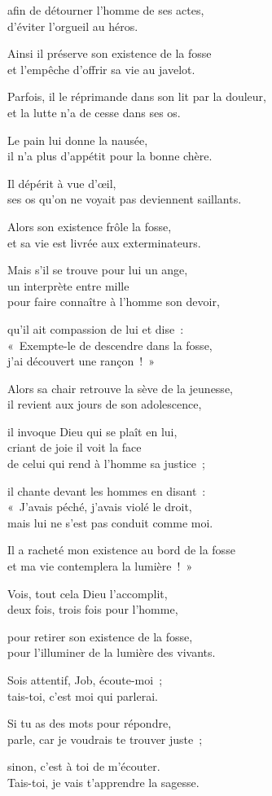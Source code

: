 \documentclass[twoside]{book} %
\newcommand{\lnatt}[1]{\reversemarginpar\marginpar[\sffamily\scriptsize #1]{}}
\newcommand{\lpar}[1]{\noindent\hangindent=2\parindent  #1\par} %
\newcommand\chapteropen{} %
\newcommand\chapterclose{} %
\renewcommand{\lnatt}[1]{\marginpar{\sffamily\scriptsize #1}}
\begin{document}
\lpar{afin de détourner l’homme de ses actes, \\
d’éviter l’orgueil au héros.}
\lpar{Ainsi il préserve son existence de la fosse \\
et l’empêche d’offrir sa vie au javelot.}
\bigskip
\lpar{Parfois, il le réprimande dans son lit par la douleur, \\
et la lutte n’a de cesse dans ses os.}
\lpar{\lnatt{20}Le pain lui donne la nausée, \\
il n’a plus d’appétit pour la bonne chère.}
\lpar{Il dépérit à vue d’œil, \\
ses os qu’on ne voyait pas deviennent saillants.}
\lpar{Alors son existence frôle la fosse, \\
et sa vie est livrée aux exterminateurs.}
\lpar{Mais s’il se trouve pour lui un ange, \\
un interprète entre mille \\
pour faire connaître à l’homme son devoir,}
\lpar{qu’il ait compassion de lui et dise : \\
« Exempte-le de descendre dans la fosse, \\
j’ai découvert une rançon ! »}
\lpar{\lnatt{25}Alors sa chair retrouve la sève de la jeunesse, \\
il revient aux jours de son adolescence,}
\lpar{il invoque Dieu qui se plaît en lui, \\
criant de joie il voit la face \\
de celui qui rend à l’homme sa justice ;}
\lpar{il chante devant les hommes en disant : \\
« J’avais péché, j’avais violé le droit, \\
mais lui ne s’est pas conduit comme moi.}
\lpar{Il a racheté mon existence au bord de la fosse \\
et ma vie contemplera la lumière ! »}
\bigskip
\lpar{Vois, tout cela Dieu l’accomplit, \\
deux fois, trois fois pour l’homme,}
\lpar{\lnatt{30}pour retirer son existence de la fosse, \\
pour l’illuminer de la lumière des vivants.}
\lpar{Sois attentif, Job, écoute-moi ; \\
tais-toi, c’est moi qui parlerai.}
\lpar{Si tu as des mots pour répondre, \\
parle, car je voudrais te trouver juste ;}
\lpar{sinon, c’est à toi de m’écouter. \\
Tais-toi, je vais t’apprendre la sagesse.}
\chapterclose


\chapteropen
\end{document}

